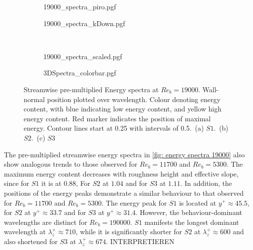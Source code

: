\begin{figure}
    \centering
    \begin{subfigure}{0.495\textwidth}
        \subcaption{}
        {19000_spectra_piro.pgf}
        \label{subfig: 11700 spectra piro}
    \end{subfigure}
    \hfill
        \begin{subfigure}{0.495\textwidth}
            \subcaption{}
            {19000_spectra_kDown.pgf}
            \label{subfig: 11700 spectra kDown}
    \end{subfigure}
    \\[-20pt]
    \begin{subfigure}{0.495\textwidth}
        \subcaption{}
        {19000_spectra_scaled.pgf}
        \label{subfig: 11700 spectra scaled}
    \end{subfigure}
    \centering
    \begin{subfigure}{\textwidth}
        \centering
        \hspace{0.9cm}
        {3DSpectra_colorbar.pgf}
    \end{subfigure}
    \caption[Streamwise pre-multiplied energy spectra at $Re_b = 19000$]{Streamwise pre-multiplied Energy spectra at $Re_b = 19000$. Wall-normal position plotted over wavelength. Colour denoting energy content, with blue indicating low energy content, and yellow high energy content. Red marker indicates the position of maximal energy. Contour lines start at 0.25 with intervals of 0.5.~(a) $S1$.~(b) $S2$.~(c) $S3$}
    \label{fig: energy spectra 19000}
\end{figure}

The pre-multiplied streamwise energy spectra in \autoref{fig: energy spectra 19000} also show analogous trends to those observed for $Re_b = 11700$ and $Re_b = 5300$.
The maximum energy content decreases with roughness height and effective slope, since for $S1$  it is at $0.88$, For $S2$ at $1.04$ and for $S3$ at $1.11$.
In addition, the positions of the energy peaks demonstrate a similar behaviour to that observed for $Re_b = 11700$ and $Re_b = 5300$.
The energy peak for $S1$ is located at $y^+ \approx 45.5$, for $S2$ at $y^+ \approx 33.7$ and for $S3$ at $y^+ \approx 31.4$.
However, the behaviour-dominant wavelengths are distinct for $Re_b = 190000$.
$S1$ manifests the longest dominant wavelength at $\lambda_z^+ \approx 710$, while it is significantly shorter for $S2$ at $\lambda_z^+ \approx 600$ and also shortened for $S3$ at $\lambda_z^+ \approx 674$. 
INTERPRETIEREN

